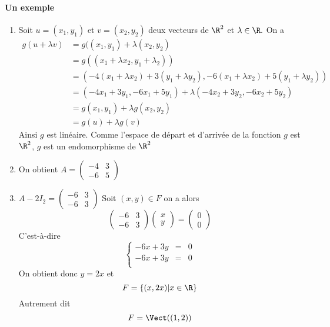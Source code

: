 \documentclass[a4paper, 11pt,reqno]{article}
\begin{document}
\begin{correction}
\paragraph{Un exemple}
\begin{enumerate}
\item Soit $u=(x_1,y_1) $ et $v=(x_2,y_2) $ deux vecteurs de $\R^2$ et $\lambda\in \R.$
On a 
\begin{align*}
g(u+\lambda v) &= g((x_1,y_1)+\lambda (x_2,y_2)\\
						&=  g((x_1 +\lambda x_2,y_1+\lambda _2))\\
						&=(-4(x_1 +\lambda x_2)+3(y_1 +\lambda y_2), -6(x_1 +\lambda x_2) + 5(y_1 +\lambda y_2))\\
						&=(-4x_1+3y_1,-6x_1+5y_1) +\lambda (-4x_2+3y_2,-6x_2+5y_2)\\
						&=g(x_1,y_1) +\lambda g(x_2,y_2)\\
						&= g(u) +\lambda g(v)
\end{align*}
Ainsi $g$ est linéaire. Comme l'espace de départ et d'arrivée de la fonction $g$ est $\R^2$,  $g$ est un endomorphisme de $\R^2$
\item On obtient $A=\begin{pmatrix}
-4 &3\\
-6 & 5
\end{pmatrix}$

\item 
$A-2I_2 = \begin{pmatrix}
-6 & 3\\
-6 & 3
\end{pmatrix}$
Soit $(x,y) \in F$ on a alors 
$$\begin{pmatrix}
-6 & 3\\
-6 & 3
\end{pmatrix} \begin{pmatrix}
x\\
y
\end{pmatrix}=\begin{pmatrix}
0\\
0
\end{pmatrix}$$
C'est-à-dire 
$$\left\{ 
\begin{array}{ccc}
-6x+3y &=&0\\
-6x+3y &=&0\\
\end{array}
\right.$$
On obtient donc $y=2x$ et 
$$F= \{ (x,2x) | x\in \R\} $$
Autrement dit 
$$F =\Vect((1,2))$$


\end{enumerate}
\end{correction}
\end{document}
